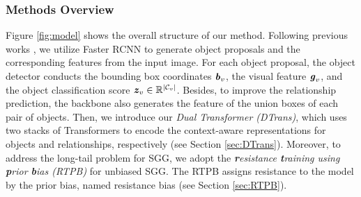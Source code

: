 \subsubsection{Methods Overview}
Figure \ref{fig:model} shows the overall structure of our method. Following previous works \cite{Tang2020_unbiased,Zellers_2018_CVPR}, we utilize Faster RCNN \cite{ren2015faster} to generate object proposals and the corresponding features from the input image.
For each object proposal, the object detector conducts the bounding box coordinates 
$\textbf{\textit{b}}_v$, %
the visual feature 
$\textbf{\textit{g}}_v$,
and the object classification score $\textbf{\textit{z}}_v\in\mathbb{R}^{|\mathcal{C}_v|}$.
Besides, to improve the relationship prediction, the backbone also generates the feature of the union boxes of each pair of objects.
Then, we introduce our \textit{Dual Transformer (DTrans)}, which uses two stacks of Transformers to encode the context-aware representations for objects and relationships, respectively (see Section \ref{sec:DTrans}). Moreover, to address the long-tail problem for SGG, we adopt the \textit{\textbf{r}esistance \textbf{t}raining using \textbf{p}rior \textbf{b}ias (RTPB)} for unbiased SGG. The RTPB assigns resistance to the model by the prior bias, named resistance bias (see Section \ref{sec:RTPB}).
% 


